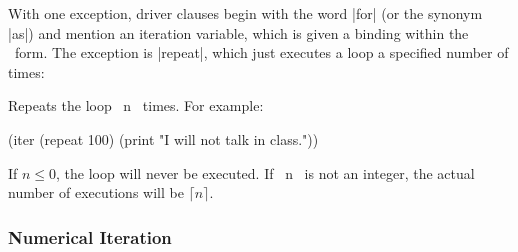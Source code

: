 With one exception, driver clauses begin with the word |for| (or
the synonym |as|) and mention an iteration variable, which is
given a binding within the \iter\ form.
The exception is |repeat|, which just executes a loop a
specified number of times:

\begin{clauses}

Repeats the loop ~n~ times.  For example:
\begin{program}
(iter (repeat 100)
      (print "I will not talk in class."))
\end{program}
\cpar If $n \leq 0$, the
loop will never be executed.  If ~n~ is not an integer, the
actual number of executions will be $\lceil n \rceil$.

\end{clauses}

\pagebreak[3]

\subsubsection{Numerical Iteration}

